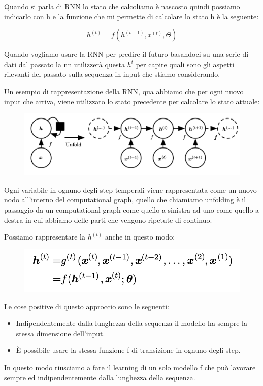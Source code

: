 \documentclass[14pt]{extreport}
\begin{document}
Quando si parla di RNN lo stato che calcoliamo è nascosto quindi possiamo indicarlo con h e la funzione che mi permette di calcolare lo stato h è la seguente:

$$h^{(t)} = f(h^{(t-1)}, x^{(t)}, \Theta)$$

Quando vogliamo usare la RNN per predire il futuro basandoci su una serie di dati dal passato la nn utilizzerà questa $h^{t}$ per capire quali sono gli aspetti rilevanti del passato sulla sequenza in input che stiamo considerando.

Un esempio di rappresentazione della RNN, qua abbiamo che per ogni nuovo input che arriva, viene utilizzato lo stato precedente per calcolare lo stato attuale:
\begin{figure}[H]
\centering
\includegraphics[width=0.7\linewidth]{415.jpeg}
\end{figure}

Ogni variabile in ognuno degli step temperali viene rappresentata come un nuovo nodo all'interno del computational graph, quello che chiamiamo unfolding è il passaggio da un 
computational graph come quello a sinistra ad uno come quello a destra in cui abbiamo delle parti che vengono ripetute di continuo.

Possiamo rappresentare la $h^{(t)}$ anche in questo modo:
\begin{figure}[H]
	\centering
	\includegraphics[width=0.7\linewidth]{416.jpeg}
	\end{figure}

Le cose positive di questo approccio sono le seguenti:
\begin{itemize}
	\item Indipendentemente dalla lunghezza della sequenza il modello ha sempre la stessa dimensione dell'input.
	\item È possibile usare la stessa funzione f di transizione in ognuno degli step.
	\end{itemize} 

In questo modo riusciamo a fare il learning di un solo modello f che può lavorare sempre ed indipendentemente dalla lunghezza della sequenza.
\end{document}
